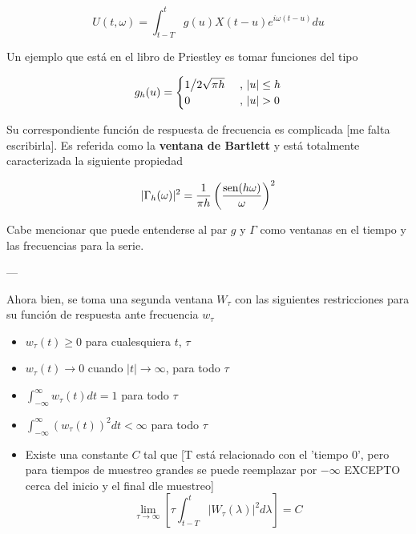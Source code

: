\begin{equation*}
U(t,\omega) = \int_{t-T}^{t} g(u) X({t-u}) e^{i \omega (t-u)} du
\end{equation*}

Un ejemplo que est\'a en el libro de Priestley es tomar funciones del tipo

\begin{equation*}
g_h(u) = 
\begin{cases}
{1 \big{/} 2\sqrt{\pi h}} & \text{ , } \lvert u \rvert \leq h
\\
0 & \text{ , } \lvert u \rvert > 0
\end{cases}
\end{equation*}

Su correspondiente funci\'on de respuesta de frecuencia es complicada [me falta 
escribirla]. Es referida como la \textbf{ventana de Bartlett} y
est\'a totalmente caracterizada la siguiente propiedad

\begin{equation*}
\lvert \Gamma_h(\omega) \rvert^{2} = \frac{1}{\pi h} \left( \frac{\text{sen} (h \omega)}{\omega} \right)^{2}
\end{equation*}

Cabe mencionar que puede entenderse al par $g$ y $\Gamma$ como ventanas en el tiempo
y las frecuencias para la serie.

---

Ahora bien, se toma una segunda ventana $W_\tau$ con las siguientes
restricciones para
su funci\'on de respuesta ante frecuencia $w_\tau$

\begin{itemize}
\item $w_{\tau}(t) \geq 0$ para cualesquiera $t$, $\tau$
\item $w_{\tau}(t) \rightarrow 0$ cuando $\lvert t \lvert \rightarrow \infty$, para todo $\tau$
\item $\displaystyle \int_{-\infty}^{\infty} w_{\tau}(t) dt = 1$ para todo $\tau$
\item $\displaystyle \int_{-\infty}^{\infty} \left( w_{\tau}(t) \right)^{2} dt < \infty$ para todo $\tau$
\item Existe una constante $C$ tal que  [T est\'a relacionado con el 'tiempo 0', pero para
tiempos de muestreo grandes se puede reemplazar por $-\infty$ EXCEPTO cerca del inicio y el final dle muestreo]
$$\lim_{\tau\rightarrow\infty} \left[ \tau \int_{t-T}^{t} \lvert W_{\tau}(\lambda) \lvert^{2} d\lambda \right] = C$$
\end{itemize}

